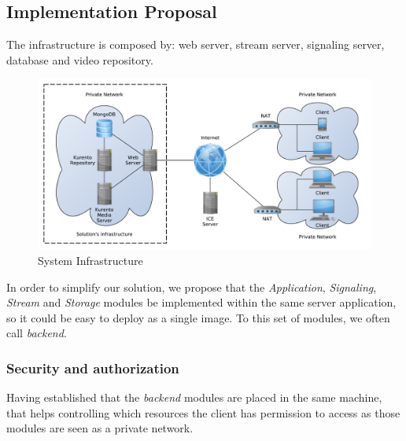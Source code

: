 \documentclass[10pt,conference]{IEEEtran}
\begin{document}


 
\subsection{Implementation Proposal}
The infrastructure is composed by: web server, stream server, signaling server, database and video repository.

\begin{figure}[H]
	\centering
	\includegraphics[width=\linewidth]{figures/infrastructure.pdf}
	\caption{System Infrastructure}
\end{figure}

In order to simplify our solution, we propose that the \emph{Application}, \emph{Signaling}, \emph{Stream} and \emph{Storage} modules be implemented within the same server application, so it could be easy to deploy as a single image. To this set of modules, we often call \emph{backend}.

	\subsubsection{Security and authorization}

Having established that the \emph{backend} modules are placed in the same machine, that helps controlling which resources the client has permission to access as those modules are seen as a private network.
\end{document}
